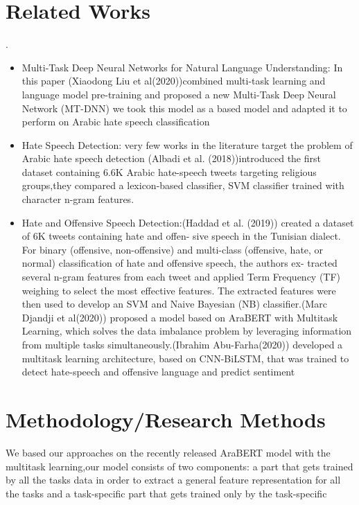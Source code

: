 \documentclass[paper=a4, fontsize=11pt]{scrartcl}
\numberwithin{equation}{section}		%
\numberwithin{figure}{section}			%
\numberwithin{table}{section}				%
\begin{document}
\section{Related Works}.
\begin{itemize}
    \item Multi-Task Deep Neural Networks for Natural Language Understanding: In this paper (Xiaodong Liu et al(2020))\cite{liu2019multi}combined multi-task learning and language model pre-training and proposed a new Multi-Task Deep Neural Network (MT-DNN) we took this model as a based model and adapted it to perform on Arabic hate speech classification 
    
    \item Hate Speech Detection: very few works in the literature target the problem of Arabic hate speech detection (Albadi et al. (2018))\cite{albadi2018they}introduced the first dataset containing 6.6K Arabic hate-speech tweets targeting religious groups,they compared a lexicon-based classifier, SVM classifier trained with character n-gram features.
    
    \item Hate and Offensive Speech Detection:(Haddad et al. (2019))\cite{haddad2019t} created a dataset of 6K tweets containing hate and offen- sive speech in the Tunisian dialect. For binary (offensive, non-offensive) and multi-class (offensive, hate, or normal) classification of hate and offensive speech, the authors ex- tracted several n-gram features from each tweet and applied Term Frequency (TF) weighing to select the most effective features. The extracted features were then used to develop an SVM and Naive Bayesian (NB) classifier.(Marc Djandji et al(2020))\cite{djandji2020multi} proposed a model based on AraBERT with Multitask Learning, which solves the data imbalance problem by leveraging information from multiple tasks simultaneously.(Ibrahim Abu-Farha(2020))\cite{farha2020multitask} developed a  multitask learning architecture, based on CNN-BiLSTM, that was trained to detect hate-speech and offensive language and predict sentiment
\end{itemize}

\section{Methodology/Research Methods}
We based our approaches on the recently released AraBERT model with the multitask learning,our model consists of two components: a part that gets trained by all the tasks data in order to extract a general feature representation for all the tasks and a task-specific part that gets trained only by the task-specific
\end{document}
